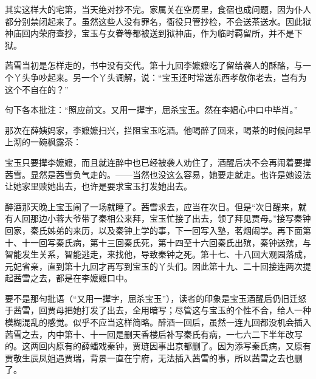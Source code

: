 \par 其实这样大的宅第，当天绝对抄不完。家属关在空房里，食宿也成问题，因为仆人都分别禁闭起来了。虽然这些人没有罪名，衙役只管抄检，不会送茶送水。因此狱神庙回内荣府查抄，宝玉与女眷等都被送到狱神庙，作为临时羁留所，并不是下狱。
\par 茜雪当初是怎样走的，书中没有交代。第十九回李嬷嬷吃了留给袭人的酥酪，与一个丫头争吵起来。另一个丫头调解，说：“宝玉还时常送东西孝敬你老去，岂有为这个不自在的？”
\par 句下各本批注：“照应前文。又用一撵字，屈杀宝玉。然在李媪心中口中毕肖。”
\par 那次在薛姨妈家，李嬷嬷扫兴，拦阻宝玉吃酒。他喝醉了回来，喝茶的时候问起早上沏的一碗枫露茶：
\par 宝玉只要撵李嬷嬷，而且就连醉中也已经被袭人劝住了，酒醒后决不会再闹着要撵茜雪。显然是茜雪负气走的。——当然也没这么容易，她要走就走。也许是她设法让她家里赎她出去，也许是要求宝玉打发她出去。
\par 醉酒那天晚上宝玉闹了一场就睡了。茜雪求去，应当在次日。但是“次日醒来，就有人回那边小蓉大爷带了秦相公来拜，宝玉忙接了出去，领了拜见贾母。”接写秦钟回家，秦氏姊弟的来历，以及秦钟上学的事，下一回写入塾，茗烟闹学。再下面第十、十一回写秦氏病，第十三回秦氏死，第十四至十六回秦氏出殡，秦钟送殡，与智能发生关系，智能逃走，来找他，导致秦钟之死。第十七、十八回大观园落成，元妃省亲，直到第十九回才再写到宝玉的丫头们。因此第十九、二十回接连两次提起茜雪之去，都是在李嬷嬷口中。
\par 要不是那句批语（“又用一撵字，屈杀宝玉”），读者的印象是宝玉酒醒后仍旧迁怒于茜雪，回贾母把她打发了出去，全用暗写；尽管这与宝玉的个性不合，给人一种模糊混乱的感觉。似乎不应当这样简略。醉酒一回后，虽然一连九回都没机会插入茜雪之去，内中第十、十一回是删天香楼后补写秦氏有病，一七六二下半年改写的。这两回内原有的薛蟠戏秦钟，贾琏因事出京都删了。因为添写秦氏病，又原有贾敬生辰凤姐遇贾瑞，背景一直在宁府，无法插入茜雪的事，所以茜雪之去也删了。

